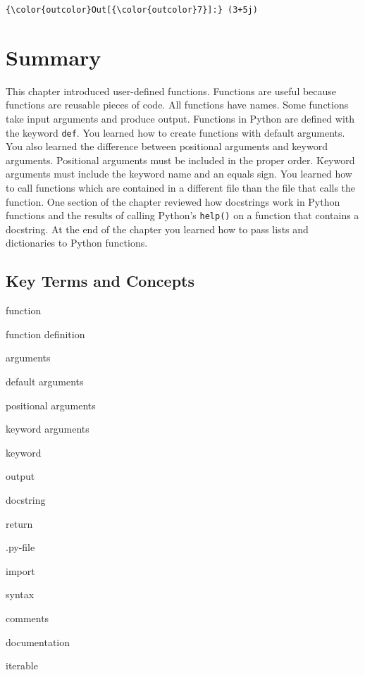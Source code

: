 \documentclass{book}
\newenvironment{key_terms}{\begin{multicols}{3}}{\end{multicols}} %
\newcommand{\passthrough}[1]{#1}
\begin{document}
\begin{Verbatim}[commandchars=\\\{\}]
{\color{outcolor}Out[{\color{outcolor}7}]:} (3+5j)
\end{Verbatim}
            

    
        \newpage
        \hypertarget{summary}{%
\section{Summary}\label{summary}}

    




    
        This chapter introduced user-defined functions. Functions are useful
because functions are reusable pieces of code. All functions have names.
Some functions take input arguments and produce output. Functions in
Python are defined with the keyword \passthrough{\lstinline!def!}. You
learned how to create functions with default arguments. You also learned
the difference between positional arguments and keyword arguments.
Positional arguments must be included in the proper order. Keyword
arguments must include the keyword name and an equals sign. You learned
how to call functions which are contained in a different file than the
file that calls the function. One section of the chapter reviewed how
docstrings work in Python functions and the results of calling Python's
\passthrough{\lstinline!help()!} on a function that contains a
docstring. At the end of the chapter you learned how to pass lists and
dictionaries to Python functions.
    




    
        \hypertarget{key-terms-and-concepts}{%
\subsection{Key Terms and Concepts}\label{key-terms-and-concepts}}
    




    
        \begin{key_terms}
        function

function definition

arguments

default arguments

positional arguments

keyword arguments

keyword

output

docstring

return

.py-file

import

syntax

comments

documentation

iterable
        \end{key_terms}
\end{document}
